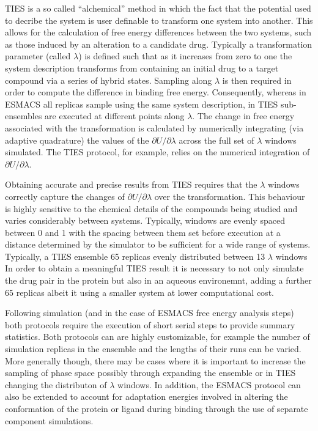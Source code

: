 
TIES is a so called ``alchemical'' method in which the fact that the potential used to decribe the system is user definable to transform one
system into another.
This allows for the calculation of free energy differences between the two
systems, such as those induced by an alteration to a candidate drug.
Typically a transformation parameter (called $\lambda$) is defined such that as it increases from zero to one the system description transforms from containing an
initial drug to a target compound via a series of hybrid states.
Sampling along $\lambda$ is then required in order to compute the difference in binding free energy.
Consequently, whereas in ESMACS all replicas sample using the same system description,
in TIES sub-ensembles are executed at different points along $\lambda$.
The change in free energy associated with the transformation is calculated by numerically integrating (via adaptive quadrature) the
values of the $\partial U/\partial\lambda$ across the full set of $\lambda$ windows simulated.
The TIES protocol, for example, relies on the numerical
integration of $\partial U/\partial\lambda$. 

Obtaining accurate and precise results from TIES requires that the $\lambda$ windows correctly
capture the changes of $\partial U/\partial\lambda$ over the transformation.
This behaviour is highly sensitive to
the chemical details of the compounds being studied and varies considerably between systems.
Typically, windows are evenly spaced between 0 and 1 with the spacing between them set before
execution at a distance determined by the simulator to be sufficient for a wide range of systems.
Typically, a TIES ensemble 65 replicas evenly distributed between 13 $\lambda$ windows
In order to obtain a meaningful TIES result it is necessary to not only simulate the drug pair
in the protein but also in an aqueous environemnt, adding a further 65 replicas albeit it using a
smaller system at lower computational cost.

Following simulation (and in the case of ESMACS free energy analysis steps) both protocols require
the execution of short serial steps to provide summary statistics.
Both protocols can are highly customizable, for example the number of simulation replicas in the
ensemble and the lengths of their runs can be varied.
More generally though, there may be cases where it is important to increase the sampling of phase
space possibly through expanding the ensemble or in TIES changing the distributon of $\lambda$
windows.
In addition, the ESMACS protocol can also be extended to account for adaptation energies involved
in altering the conformation of the protein or ligand during binding through the use of separate
component simulations.

